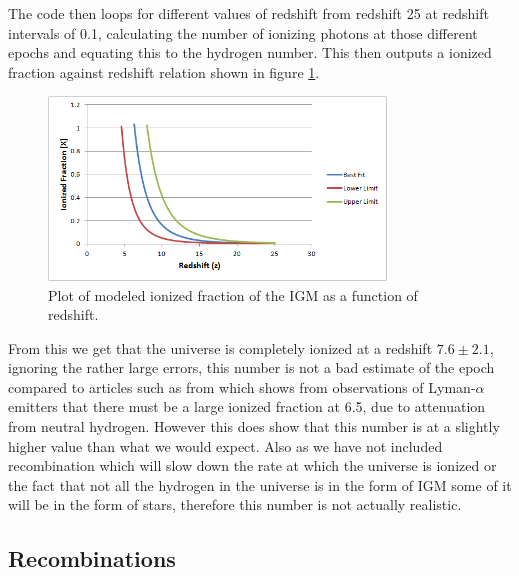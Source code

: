	The code then loops for different values of redshift from redshift 25 at redshift intervals of 0.1, calculating the number of ionizing photons at those different epochs and equating this to the hydrogen number. This then outputs a ionized fraction against redshift relation shown in figure \ref{fig:IonizedFraction1}.
	\begin{figure}[!htb]
		\centering
			\includegraphics[width=0.8\textwidth]{../Images/IonizedFraction1.png}
		\caption{Plot of modeled ionized fraction of the IGM as a function of redshift.\label{fig:IonizedFraction1}}
	\end{figure}

	From this we get that the universe is completely ionized at a redshift $7.6\pm2.1$, ignoring the rather large errors, this number is not a bad estimate of the epoch compared to articles such as from \cite{Ota:arXiv0707.1561} which shows from observations of Lyman-$\alpha$ emitters that there must be a large ionized fraction at 6.5, due to attenuation from neutral hydrogen. However this does show that this number is at a slightly higher value than what we would expect. Also as we have not included recombination which will slow down the rate at which the universe is ionized or the fact that not all the hydrogen in the universe is in the form of IGM some of it will be in the form of stars, therefore this number is not actually realistic.

\subsection{Recombinations} %
\label{sub:recombinations}

